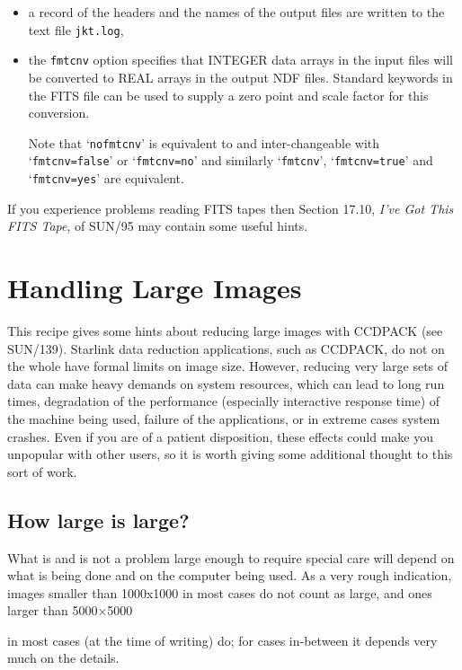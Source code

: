 \documentclass[twoside,11pt]{article}
\newcommand{\html}[1]{}
\newcommand{\latex}[1]{#1}
\newcommand{\xref}[3]{#1}
\newcommand{\xlabel}[1]{}
\begin{document}
\begin{description}
\begin{itemize}
    \item a record of the headers and the names of the output files are
     written to the text file {\tt jkt.log},

    \item the {\tt fmtcnv} option specifies that INTEGER data arrays
     in the input files will be converted to REAL arrays in the output
     NDF files.  Standard keywords in the FITS file can be used to supply
     a zero point and scale factor for this conversion.

     Note that `{\tt nofmtcnv}' is equivalent to and inter-changeable with
     `{\tt fmtcnv=false}' or `{\tt fmtcnv=no}' and similarly `{\tt fmtcnv}',
     `{\tt fmtcnv=true}' and `{\tt fmtcnv=yes}' are equivalent.

  \end{itemize}

\end{description}

If you experience problems reading FITS tapes then Section 17.10,
\xref{{\it I've Got This FITS Tape}}{sun95}{se_fitsunixtape},
of \xref{SUN/95}{sun95}{}\/\cite{SUN95} may contain some useful hints.


\newpage
\section{\xlabel{LARGE}\label{LARGE}Handling Large Images}


This recipe gives some hints about reducing large images with CCDPACK
(see \xref{SUN/139}{sun139}{}\/\cite{SUN139}).
Starlink data reduction applications, such as CCDPACK, do not on the whole
have formal limits on image size.  However,
reducing very large sets of data can make heavy demands
on system resources, which
can lead to long run times, degradation of the performance
(especially interactive response time)
of the machine being used,
failure of the applications,
or in extreme cases system crashes.
Even if you are of a patient disposition,
these effects could make you unpopular with other users,
so it is worth giving some additional thought to this sort of work.

\subsection{\xlabel{HOWLARGE}How large is large?}

What is and is not a problem large enough to require special care
will depend on what is being done and on
the computer being used.
As a very rough indication, images smaller than 1000x1000
in most cases do not
count as large, and ones larger than
\latex{5000$\times$5000 }
\html{5000x5000 }
in most cases (at the time of writing) do;
for cases in-between it depends very much on the details.
\end{document}
